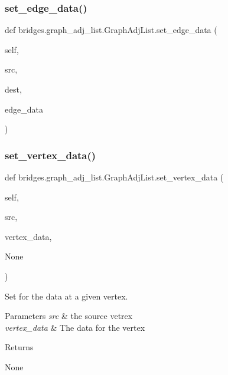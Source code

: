 \subsubsection{\texorpdfstring{set\+\_\+edge\+\_\+data()}{set\_edge\_data()}}
{\footnotesize\ttfamily def bridges.\+graph\+\_\+adj\+\_\+list.\+Graph\+Adj\+List.\+set\+\_\+edge\+\_\+data (\begin{DoxyParamCaption}\item[{}]{self,  }\item[{}]{src,  }\item[{}]{dest,  }\item[{}]{edge\+\_\+data }\end{DoxyParamCaption})}

\mbox{\label{classbridges_1_1graph__adj__list_1_1_graph_adj_list_a7b4669b353a04f6868710c22790bd263}} 
\subsubsection{\texorpdfstring{set\+\_\+vertex\+\_\+data()}{set\_vertex\_data()}}
{\footnotesize\ttfamily def bridges.\+graph\+\_\+adj\+\_\+list.\+Graph\+Adj\+List.\+set\+\_\+vertex\+\_\+data (\begin{DoxyParamCaption}\item[{}]{self,  }\item[{}]{src,  }\item[{}]{vertex\+\_\+data,  }\item[{}]{None }\end{DoxyParamCaption})}



Set for the data at a given vertex. 


\begin{DoxyParams}{Parameters}
{\em src} & the source vetrex \\
\hline
{\em vertex\+\_\+data} & The data for the vertex \\
\hline
\end{DoxyParams}
\begin{DoxyReturn}{Returns}


None
\end{DoxyReturn}

